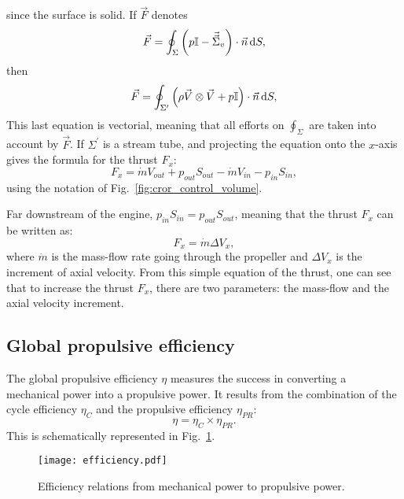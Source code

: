since the surface is solid. If $\vec{F}$ denotes
\begin{equation}
	\vec{F} = \oint_{\Sigma} \left(p \mathbb{I} - 
	\vec{\vec{\Sigma}}_v \right) \cdot \vec{n} \mathop{}\!\mathrm{d} S,
\end{equation}
then
\begin{equation}
	\vec{F} = \oint_{\Sigma^\prime} \left(\rho \vec{V} \otimes \vec{V} +
	p \mathbb{I} \right) \cdot \vec{n} \mathop{}\!\mathrm{d} S,
\end{equation}
This last equation is vectorial, meaning that all efforts on 
$\oint_{\Sigma}$ are taken into account by $\vec{F}$.
If $\Sigma^\prime$ is a stream tube, and projecting the equation
onto the $x$-axis gives the formula for the thrust $F_x$:
\begin{equation}
	F_x = \dot{m} V_{out} + p_{out} S_{out}
	- \dot{m} V_{in} - p_{in} S_{in},
\end{equation}
using the notation of Fig.~\ref{fig:cror_control_volume}.

Far downstream of the engine, $p_{in} S_{in} = p_{out} S_{out}$, meaning
that the thrust $F_x$ can be written as:
\begin{equation}
	F_x = \dot{m} \Delta V_x,
	\label{eq:cror_thrust}
\end{equation}
where $\dot{m}$ is the mass-flow rate going through the
propeller and $\Delta V_x$ is
the increment of axial velocity. From this simple equation of the thrust,
one can see that to increase the thrust $F_x$, there are two parameters:
the mass-flow and the axial velocity increment.

\subsection{Global propulsive efficiency}
\label{sub:cror_efficiency}

The global propulsive efficiency $\eta$ measures the 
success in converting a mechanical power into a
propulsive power. It results from the combination
of the cycle efficiency $\eta_{C}$ and the propulsive efficiency
$\eta_{PR}$:
\begin{equation}
	\eta = \eta_{C} \times \eta_{PR}.
\end{equation}
This is schematically represented in Fig.~\ref{fig:cror_efficiency}.
\begin{figure}[htb]
  \centering
  \texttt{[image: efficiency.pdf]}
  \caption{Efficiency relations from mechanical power to propulsive power.}
  \label{fig:cror_efficiency}
\end{figure}


